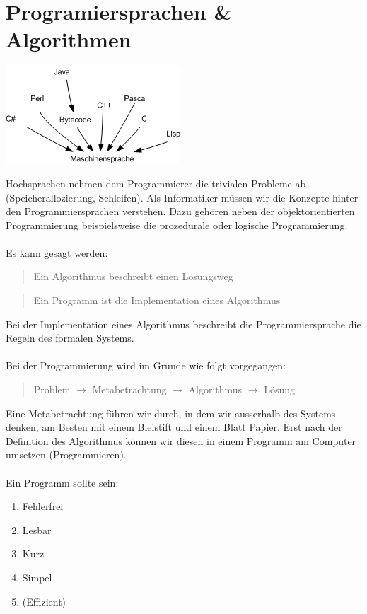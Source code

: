 \documentclass{report}
\begin{document}
\section{Programiersprachen \& Algorithmen}
\begin{center}\includegraphics[scale=0.5]{img/hochsprachen.png}\end{center}
Hochsprachen nehmen dem Programmierer die trivialen Probleme ab (Speicherallozierung, Schleifen). Als Informatiker müssen wir die Konzepte hinter den Programmiersprachen verstehen. Dazu gehören neben der objektorientierten Programmierung beispielsweise die prozedurale oder logische Programmierung.\\\\
Es kann gesagt werden:
\begin{quote}Ein Algorithmus beschreibt einen Lösungsweg\end{quote}
\begin{quote}Ein Programm ist die Implementation eines Algorithmus\end{quote}
Bei der Implementation eines Algorithmus beschreibt die Programmiersprache die Regeln des formalen Systems.\\\\
Bei  der Programmierung wird im Grunde wie folgt vorgegangen:
\begin{quote}Problem $\to$ Metabetrachtung $\to$ Algorithmus $\to$ Lösung\end{quote}
Eine Metabetrachtung führen wir durch, in dem wir ausserhalb des Systems denken, am Besten mit einem Bleistift und einem Blatt Papier. Erst nach der Definition des Algorithmus können wir diesen in einem Programm am Computer umsetzen (Programmieren).\\\\
Ein Programm sollte sein:\begin{enumerate} 
\item \underline{Fehlerfrei}
\item \underline{Lesbar}
\item Kurz
\item Simpel
\item (Effizient)
\end{enumerate}
\end{document}
